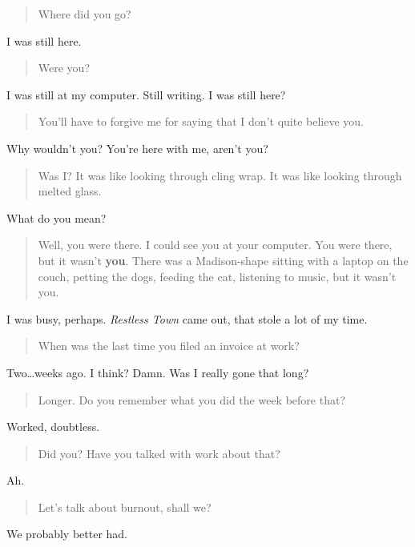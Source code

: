 \begin{quote}
Where did you go?
\end{quote}
I was still here.

\begin{quote}
Were you?
\end{quote}
I was still at my computer. Still writing. I was still here?

\begin{quote}
You'll have to forgive me for saying that I don't quite believe you.
\end{quote}
Why wouldn't you? You're here with me, aren't you?

\begin{quote}
Was I? It was like looking through cling wrap. It was like looking through melted glass.
\end{quote}
What do you mean?

\begin{quote}
Well, you were there. I could see you at your computer. You were there, but it wasn't \textbf{you}. There was a Madison-shape sitting with a laptop on the couch, petting the dogs, feeding the cat, listening to music, but it wasn't you.
\end{quote}
I was busy, perhaps. \emph{Restless Town} came out, that stole a lot of my time.

\begin{quote}
When was the last time you filed an invoice at work?
\end{quote}
Two\ldots{}weeks ago. I think? Damn. Was I really gone that long?

\begin{quote}
Longer. Do you remember what you did the week before that?
\end{quote}
Worked, doubtless.

\begin{quote}
Did you? Have you talked with work about that?
\end{quote}
Ah.

\begin{quote}
Let's talk about burnout, shall we?
\end{quote}
We probably better had.
\newpage
